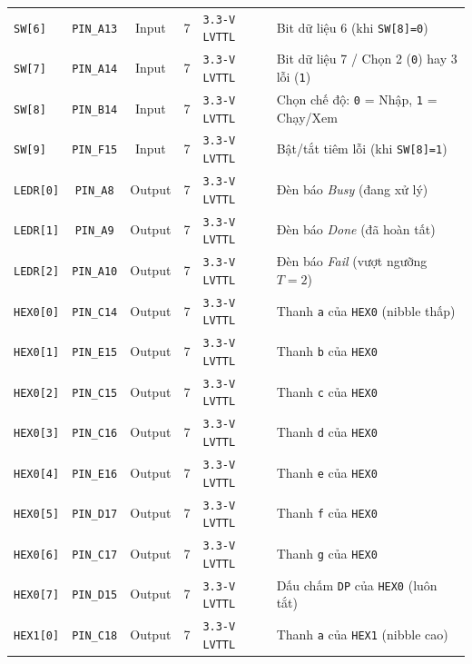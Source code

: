 \begin{table}[!htb]
\begin{tabular}{l c c c l p{4.6cm}}
        \texttt{SW[6]} & \texttt{PIN\_A13} & Input & 7 & \texttt{3.3-V LVTTL} & Bit dữ liệu 6 (khi \texttt{SW[8]=0}) \\
        \texttt{SW[7]} & \texttt{PIN\_A14} & Input & 7 & \texttt{3.3-V LVTTL} & Bit dữ liệu 7 / Chọn 2 (\texttt{0}) hay 3 lỗi (\texttt{1}) \\
        \texttt{SW[8]} & \texttt{PIN\_B14} & Input & 7 & \texttt{3.3-V LVTTL} & Chọn chế độ: \texttt{0} = Nhập, \texttt{1} = Chạy/Xem \\
        \texttt{SW[9]} & \texttt{PIN\_F15} & Input & 7 & \texttt{3.3-V LVTTL} & Bật/tắt tiêm lỗi (khi \texttt{SW[8]=1}) \\
        \midrule
        \texttt{LEDR[0]} & \texttt{PIN\_A8} & Output & 7 & \texttt{3.3-V LVTTL} & Đèn báo \textit{Busy} (đang xử lý) \\
        \texttt{LEDR[1]} & \texttt{PIN\_A9} & Output & 7 & \texttt{3.3-V LVTTL} & Đèn báo \textit{Done} (đã hoàn tất) \\
        \texttt{LEDR[2]} & \texttt{PIN\_A10} & Output & 7 & \texttt{3.3-V LVTTL} & Đèn báo \textit{Fail} (vượt ngưỡng $T=2$) \\
        \texttt{HEX0[0]} & \texttt{PIN\_C14} & Output & 7 & \texttt{3.3-V LVTTL} & Thanh \texttt{a} của \texttt{HEX0} (nibble thấp) \\
        \texttt{HEX0[1]} & \texttt{PIN\_E15} & Output & 7 & \texttt{3.3-V LVTTL} & Thanh \texttt{b} của \texttt{HEX0} \\
        \texttt{HEX0[2]} & \texttt{PIN\_C15} & Output & 7 & \texttt{3.3-V LVTTL} & Thanh \texttt{c} của \texttt{HEX0} \\
        \texttt{HEX0[3]} & \texttt{PIN\_C16} & Output & 7 & \texttt{3.3-V LVTTL} & Thanh \texttt{d} của \texttt{HEX0} \\
        \texttt{HEX0[4]} & \texttt{PIN\_E16} & Output & 7 & \texttt{3.3-V LVTTL} & Thanh \texttt{e} của \texttt{HEX0} \\
        \texttt{HEX0[5]} & \texttt{PIN\_D17} & Output & 7 & \texttt{3.3-V LVTTL} & Thanh \texttt{f} của \texttt{HEX0} \\
        \texttt{HEX0[6]} & \texttt{PIN\_C17} & Output & 7 & \texttt{3.3-V LVTTL} & Thanh \texttt{g} của \texttt{HEX0} \\
        \texttt{HEX0[7]} & \texttt{PIN\_D15} & Output & 7 & \texttt{3.3-V LVTTL} & Dấu chấm \texttt{DP} của \texttt{HEX0} (luôn tắt) \\
        \texttt{HEX1[0]} & \texttt{PIN\_C18} & Output & 7 & \texttt{3.3-V LVTTL} & Thanh \texttt{a} của \texttt{HEX1} (nibble cao) \\

\end{tabular}
\end{table}

